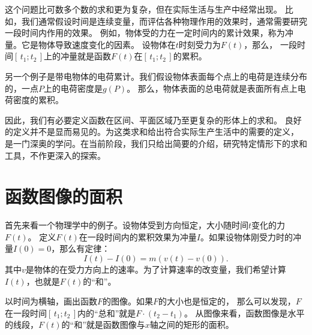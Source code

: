 \documentclass[12pt,UTF8]{ctexbook}
\begin{document}
这个问题比可数多个数的求和更为复杂，但在实际生活与生产中经常出现。
比如，我们通常假设时间是连续变量，而评估各种物理作用的效果时，通常需要研究一段时间内作用的效果。
例如，物体受的力在一定时间内的累计效果，称为冲量。它是物体导致速度变化的因素。
设物体在$t$时刻受力为$F(t)$，那么，
一段时间$[\,t_1; t_2\,]$上的冲量就是函数$F(t)$在$[\,t_1; t_2\,]$的累积。

另一个例子是带电物体的电荷累计。我们假设物体表面每个点上的电荷是连续分布的，一点$P$上的电荷密度是$g(P)$。
那么，物体表面的总电荷就是表面所有点上电荷密度的累积。

因此，我们有必要定义函数在区间、平面区域乃至更复杂的形体上的求和。
良好的定义并不是显而易见的。为这类求和给出符合实际生产生活中的需要的定义，
是一门深奥的学问。在当前阶段，我们只给出简要的介绍，研究特定情形下的求和工具，不作更深入的探索。

\section{函数图像的面积}

首先来看一个物理学中的例子。设物体受到方向恒定，大小随时间$t$变化的力$F(t)$。
定义$F(t)$在一段时间内的累积效果为冲量$I$。如果设物体刚受力时的冲量$I(0) = 0$，那么有定律：
$$ I(t) - I(0) = m(v(t) - v(0)).$$
其中$v$是物体的在受力方向上的速率。为了计算速率的改变量，我们希望计算$I(t)$，也就是$F(t)$的“和”。

以时间为横轴，画出函数$F$的图像。如果$F$的大小也是恒定的，
那么可以发现，$F$在一段时间$[\,t_1; t_2\,]$内的“总和”就是$F \cdot (t_2 - t_1)$。
从图像来看，函数图像是水平的线段，$F(t)$的“和”就是函数图像与$x$轴之间的矩形的面积。
\end{document}
